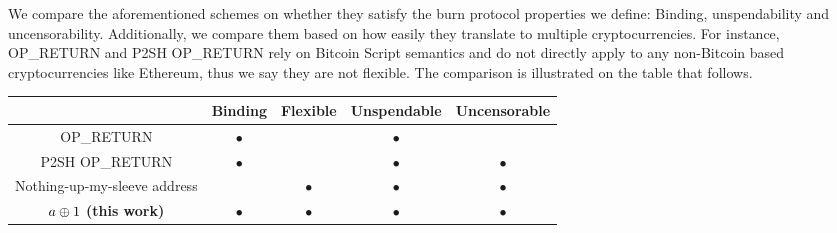 We compare the aforementioned schemes on whether they satisfy the burn protocol properties we define: Binding, unspendability and uncensorability. Additionally, we compare them based on how easily they translate to multiple cryptocurrencies. For instance, OP\_RETURN and P2SH OP\_RETURN rely on Bitcoin Script semantics and do not directly apply to any non-Bitcoin based cryptocurrencies like Ethereum, thus we say they are not flexible. The comparison is illustrated on the table that follows.

\begin{center}
    \newcommand{\y}{$\bullet$}
    \newcommand{\n}{}
    \begin{tabular}{ |c|c|c|c|c| }
     \hline
                                        & Binding & Flexible & Unspendable & Uncensorable \\
     \hline
     OP\_RETURN                         & \y      & \n       & \y          & \n \\
     P2SH OP\_RETURN                    & \y      & \n       & \y          & \y \\
     Nothing-up-my-sleeve address       & \n      & \y       & \y          & \y \\
     $a \oplus 1$ \textbf{(this work)}    & \y      & \y       & \y          & \y \\
     \hline
    \end{tabular}
\end{center}
